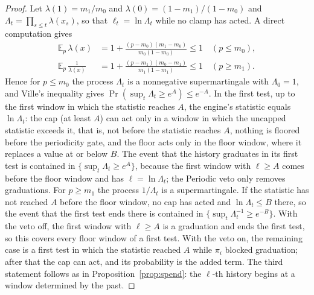 \begin{proof}
Let $\lambda(1)=m_1/m_0$ and $\lambda(0)=(1-m_1)/(1-m_0)$ and $\Lambda_t=\prod_{s\le t}\lambda(x_s)$, so that $\ell_t=\ln\Lambda_t$ while no clamp has acted. A direct computation gives
\begin{align*}
  \mathbb{E}_p\,\lambda(x)&=1+\frac{(p-m_0)(m_1-m_0)}{m_0(1-m_0)}\le1\quad(p\le m_0),\\
  \mathbb{E}_p\,\frac{1}{\lambda(x)}&=1+\frac{(p-m_1)(m_0-m_1)}{m_1(1-m_1)}\le1\quad(p\ge m_1).
\end{align*}
Hence for $p\le m_0$ the process $\Lambda_t$ is a nonnegative supermartingale with $\Lambda_0=1$, and Ville's inequality \citep[Lemma~1]{howard2020timeuniform} gives $\Pr(\sup_t\Lambda_t\ge e^{A})\le e^{-A}$. In the first test, up to the first window in which the statistic reaches $A$, the engine's statistic equals $\ln\Lambda_t$: the cap (at least $A$) can act only in a window in which the uncapped statistic exceeds it, that is, not before the statistic reaches $A$, nothing is floored before the periodicity gate, and the floor acts only in the floor window, where it replaces a value at or below $B$. The event that the history graduates in its first test is contained in $\{\sup_t\Lambda_t\ge e^{A}\}$, because the first window with $\ell\ge A$ comes before the floor window and has $\ell=\ln\Lambda_t$; the Periodic veto only removes graduations. For $p\ge m_1$ the process $1/\Lambda_t$ is a supermartingale. If the statistic has not reached $A$ before the floor window, no cap has acted and $\ln\Lambda_t\le B$ there, so the event that the first test ends there is contained in $\{\sup_t\Lambda_t^{-1}\ge e^{-B}\}$. With the veto off, the first window with $\ell\ge A$ is a graduation and ends the first test, so this covers every floor window of a first test. With the veto on, the remaining case is a first test in which the statistic reached $A$ while $\pi_i$ blocked graduation; after that the cap can act, and its probability is the added term. The third statement follows as in Proposition~\ref{prop:spend}: the $\ell$-th history begins at a window determined by the past.
\end{proof}

